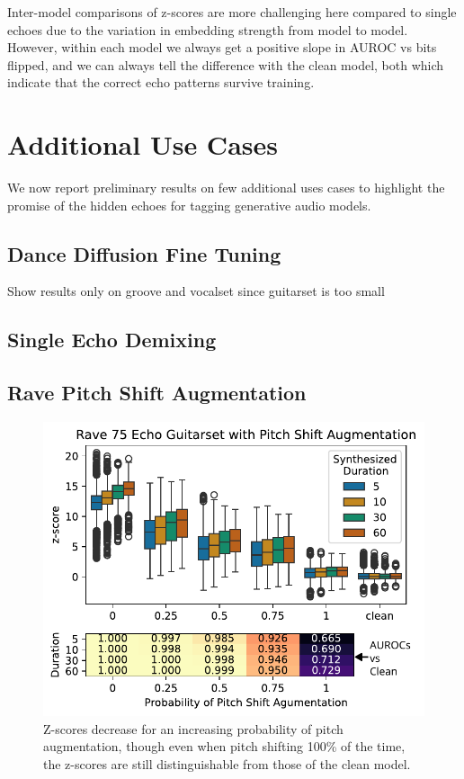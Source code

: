 \documentclass[letterpaper]{article} %
\begin{document}
Inter-model comparisons of z-scores are more challenging here compared to single echoes due to the variation in embedding strength from model to model.   However, within each model we always get a positive slope in AUROC vs bits flipped, and we can always tell the difference with the clean model, both which indicate that the correct echo patterns survive training.


\section{Additional Use Cases}

We now report preliminary results on few additional uses cases to highlight the promise of the hidden echoes for tagging generative audio models.



\subsection{Dance Diffusion Fine Tuning}

Show results only on groove and vocalset since guitarset is too small


\subsection{Single Echo Demixing}



\subsection{Rave Pitch Shift Augmentation}

\begin{figure}
    \centering
    \includegraphics[width=\columnwidth]{figs/RavePercPitchShift.pdf}
    \caption{Z-scores decrease for an increasing probability of pitch augmentation, though even when pitch shifting 100\% of the time, the z-scores are still distinguishable from those of the clean model.}
    \label{fig:pitchshiftaugmentation}
\end{figure}
\end{document}
